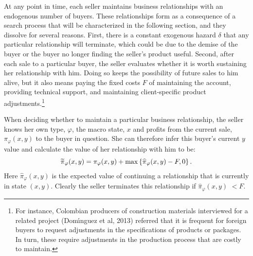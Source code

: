 \documentclass[12pt]{article}
\begin{document}
At any point in time, each seller maintains business relationships with an
endogenous number of buyers. These relationships form as a consequence of a
search process that will be characterized in the following section, and they
dissolve for several reasons. First, there is a constant exogenous hazard $%
\delta $ that any particular relationship will terminate, which could be due
to the demise of the buyer or the buyer no longer finding the seller's
product useful. Second, after each sale to a particular buyer, the seller
evaluates whether it is worth sustaining her relationship with him. Doing so
keeps the possibility of future sales to him alive, but it also means paying
the fixed costs $F$ of maintaining the account, providing technical support,
and maintaining client-specific product adjustments.\footnote{%
For instance, Colombian producers of construction materials interviewed for
a related project (Dom\'{\i}nguez et al, 2013) referred that it is frequent
for foreign buyers to request adjustments in the specifications of products
or packages. In turn, these require adjustments in the production process
that are costly to maintain.\medskip}

When deciding whether to maintain a particular business relationship, the
seller knows her own type, $\varphi $, the macro state, $x$ and profits from
the current sale, $\pi _{\varphi }(x,y)$ to the buyer in question. She can
therefore infer this buyer's current $y$ value and calculate the value of
her relationship with him to be:%
\begin{equation*}
\widetilde{\pi }_{\varphi }(x,y)=\pi _{\varphi }(x,y)+\max \left\{ \widehat{%
\pi }_{\varphi }(x,y)-F,0\right\} .
\end{equation*}%
Here $\widehat{\pi }_{\varphi }(x,y)$ is the expected value of continuing a
relationship that is currently in state $(x,y).$ Clearly the seller
terminates this relationship if $\widehat{\pi }_{\varphi }(x,y)$ $<F.$
\end{document}
